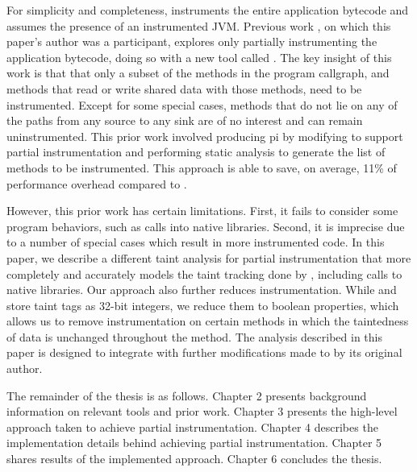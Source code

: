 For simplicity and completeness, \phosphor{} instruments the entire
application bytecode and assumes the presence of an instrumented
JVM. Previous work \cite{manoj_project}, on which this paper's author
was a participant, explores only partially instrumenting the
application bytecode, doing so with a new tool called \phosphorpi{}. The
key insight of this work is that that only a subset of the methods in
the program callgraph, and methods that read or write shared data with
those methods, need to be instrumented. Except for some special cases,
methods that do not lie on any of the paths from any source to any
sink are of no interest and can remain uninstrumented. This prior work
involved producing \phosphor{}pi by modifying \phosphor{} to support
partial instrumentation and performing static analysis to generate the
list of methods to be instrumented. This approach is able to save, on
average, 11\% of performance overhead compared to \phosphor{}.

However, this prior work has certain limitations. First, it fails to
consider some program behaviors, such as calls into native
libraries. Second, it is imprecise due to a number of special cases
which result in more instrumented code. In this paper, we describe a
different taint analysis for partial instrumentation that more
completely and accurately models the taint tracking done by
\phosphor{}, including calls to native libraries. Our approach also
further reduces instrumentation. While \phosphor{} and \phosphorpi{}
store taint tags as 32-bit integers, we reduce them to boolean
properties, which allows us to remove instrumentation on certain
methods in which the taintedness of data is unchanged throughout the
method. The analysis described in this paper is designed to integrate
with further modifications made to \phosphor{} by its original author.

The remainder of the thesis is as follows. Chapter 2 presents
background information on relevant tools and prior work. Chapter 3
presents the high-level approach taken to achieve partial
instrumentation. Chapter 4 describes the implementation details behind
achieving partial instrumentation. Chapter 5 shares results of the
implemented approach. Chapter 6 concludes the thesis.
